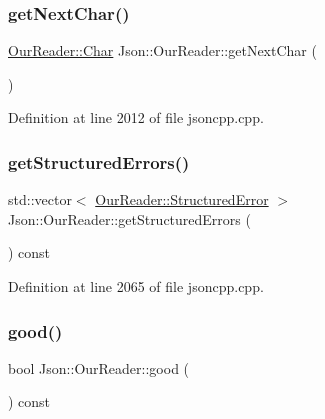 \subsubsection{\texorpdfstring{get\+Next\+Char()}{getNextChar()}}
{\footnotesize\ttfamily \hyperlink{class_json_1_1_our_reader_a0cd0bab4caa66594ab843ccd5f9dc239}{Our\+Reader\+::\+Char} Json\+::\+Our\+Reader\+::get\+Next\+Char (\begin{DoxyParamCaption}{ }\end{DoxyParamCaption})\hspace{0.3cm}{\ttfamily [private]}}



Definition at line 2012 of file jsoncpp.\+cpp.

\hypertarget{class_json_1_1_our_reader_a0eb2420a6bef89a3f3256191e6e3de6d}{}\label{class_json_1_1_our_reader_a0eb2420a6bef89a3f3256191e6e3de6d} 
\subsubsection{\texorpdfstring{get\+Structured\+Errors()}{getStructuredErrors()}}
{\footnotesize\ttfamily std\+::vector$<$ \hyperlink{struct_json_1_1_our_reader_1_1_structured_error}{Our\+Reader\+::\+Structured\+Error} $>$ Json\+::\+Our\+Reader\+::get\+Structured\+Errors (\begin{DoxyParamCaption}{ }\end{DoxyParamCaption}) const}



Definition at line 2065 of file jsoncpp.\+cpp.

\hypertarget{class_json_1_1_our_reader_a63c7d874fa379397e0a5fa65f0843845}{}\label{class_json_1_1_our_reader_a63c7d874fa379397e0a5fa65f0843845} 
\subsubsection{\texorpdfstring{good()}{good()}}
{\footnotesize\ttfamily bool Json\+::\+Our\+Reader\+::good (\begin{DoxyParamCaption}{ }\end{DoxyParamCaption}) const}



